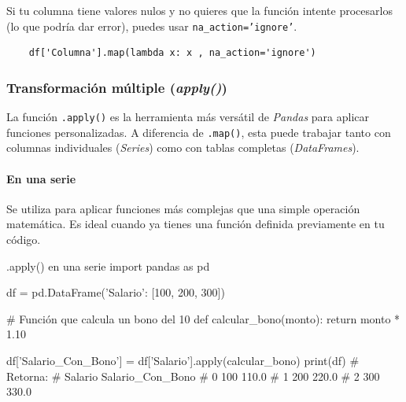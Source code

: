 
\begin{nota}
    Si tu columna tiene valores nulos y no quieres que la función intente procesarlos (lo que podría dar error), puedes usar \texttt{na\_action='ignore'}.
    \begin{verbatim}
    df['Columna'].map(lambda x: x , na_action='ignore')
    \end{verbatim}
\end{nota}


\subsubsection{Transformación múltiple (\textit{apply()})}

La función \texttt{.apply()} es la herramienta más versátil de \textit{Pandas} para aplicar funciones personalizadas. A diferencia de \texttt{.map()}, esta puede trabajar tanto con columnas individuales (\textit{Series}) como con tablas completas (\textit{DataFrames}).

\paragraph{En una serie}
Se utiliza para aplicar funciones más complejas que una simple operación matemática. Es ideal cuando ya tienes una función definida previamente en tu código.
\begin{pycode}{.apply() en una serie}
import pandas as pd

df = pd.DataFrame({'Salario': [100, 200, 300]})

# Función que calcula un bono del 10%
def calcular_bono(monto):
    return monto * 1.10

df['Salario_Con_Bono'] = df['Salario'].apply(calcular_bono)
print(df) # Retorna:
#    Salario  Salario_Con_Bono
# 0      100             110.0
# 1      200             220.0
# 2      300             330.0
\end{pycode}

